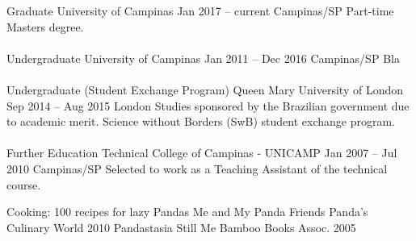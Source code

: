 \documentclass[
	a4paper,
]{fortysecondscv}
\newcommand{\profiledivider}{\textcolor{body!30}{\hdashrule{\linewidth}{0.6pt}{0.5ex}}\\}
\begin{document}
\graphicspath{{../figures/education/}}
    \cvevent
        {Graduate}
        {University of Campinas}
        {Jan 2017 -- current}
        {Campinas/SP}
        {}
        {Part-time Masters degree.}
    \\\profiledivider
	\cvevent
        {Undergraduate}
        {University of Campinas}
        {Jan 2011 -- Dec 2016}
        {Campinas/SP}
        {}
        {Bla}
    \\\profiledivider
    \cvevent
        {Undergraduate (Student Exchange Program)}
        {Queen Mary University of London}
        {Sep 2014 -- Aug 2015}
        {London}
        {}
        {Studies sponsored by the Brazilian government due to academic merit. Science without Borders (SwB) student exchange program.}
    \\\profiledivider
	\cvevent
        {Further Education}
        {Technical College of Campinas - UNICAMP}
        {Jan 2007 -- Jul 2010}
        {Campinas/SP}
        {}
        {Selected to work as a Teaching Assistant of the technical course.}


\begin{cvtable}
	\cvpubitem
        {Cooking: 100 recipes for lazy Pandas}
        {Me and My Panda Friends}
		{Panda's Culinary World}
        {2010}
	\cvpubitem
        {Pandastasia}
        {Still Me}
        {Bamboo Books Assoc.}
        {2005}
\end{cvtable}
\end{document}
